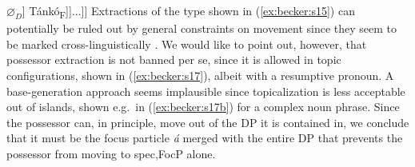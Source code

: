 \documentclass[output=paper,
modfonts
]{langscibook}
\begin{document}
\ea \relax[\textsubscript{FocP} \tikzmark{s16f2}\hspace{2mm}\tikzmark{s16f} [\textsubscript{Foc} c\'i] [\textsubscript{TP} ... [\textsubscript{F\tikzmark{s16t}P} \'a [\textsubscript{DP} [\textsubscript{D$'$} [\textsubscript{NP} nd\'ur] $\varnothing_D$] Tánkó\textsubscript{F}]]...]]
     \label{ex:becker:s16}
\z
\vspace{2\baselineskip}
Extractions of the type shown in (\ref{ex:becker:s15}) can potentially be ruled out by general constraints on movement since they seem to be marked cross-linguistically \citep{Corver1990a,Zeljko2005}. We would like to point out, however, that possessor extraction is not banned per se, since it is allowed in topic configurations, shown in (\ref{ex:becker:s17}), albeit with a resumptive pronoun. A base-generation approach seems implausible since topicalization is less acceptable out of islands, shown e.g.\ in (\ref{ex:becker:s17b}) for a complex noun phrase.
\ea
{}
\z \z
Since the possessor can, in principle, move out of the DP it is contained in, we conclude that it must be the focus particle {\em \'a} merged with the entire DP that prevents the possessor from moving to spec,FocP alone.
\end{document}
